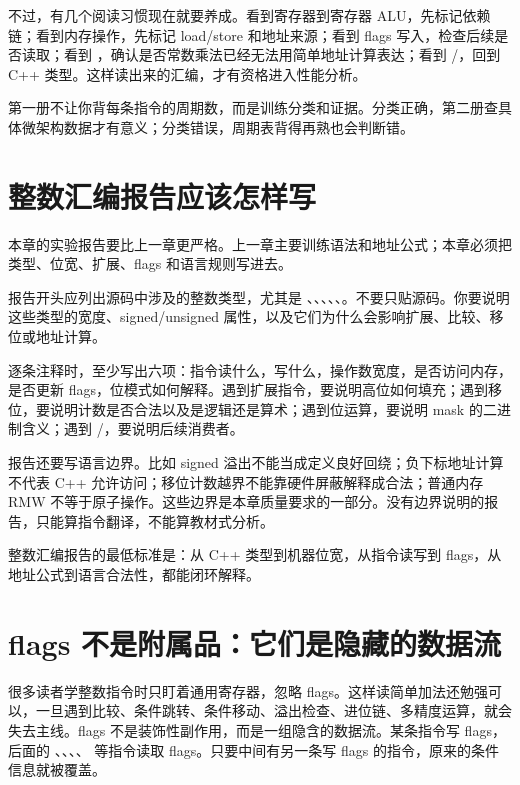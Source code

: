 不过，有几个阅读习惯现在就要养成。看到寄存器到寄存器 ALU，先标记依赖链；看到内存操作，先标记 load/store 和地址来源；看到 flags 写入，检查后续是否读取；看到 ，确认是否常数乘法已经无法用简单地址计算表达；看到 /，回到 C++ 类型。这样读出来的汇编，才有资格进入性能分析。

\begin{mentalmodel}
第一册不让你背每条指令的周期数，而是训练分类和证据。分类正确，第二册查具体微架构数据才有意义；分类错误，周期表背得再熟也会判断错。
\end{mentalmodel}

\section{整数汇编报告应该怎样写}

本章的实验报告要比上一章更严格。上一章主要训练语法和地址公式；本章必须把类型、位宽、扩展、flags 和语言规则写进去。

报告开头应列出源码中涉及的整数类型，尤其是 、、、、、。不要只贴源码。你要说明这些类型的宽度、signed/unsigned 属性，以及它们为什么会影响扩展、比较、移位或地址计算。

逐条注释时，至少写出六项：指令读什么，写什么，操作数宽度，是否访问内存，是否更新 flags，位模式如何解释。遇到扩展指令，要说明高位如何填充；遇到移位，要说明计数是否合法以及是逻辑还是算术；遇到位运算，要说明 mask 的二进制含义；遇到 /，要说明后续消费者。

报告还要写语言边界。比如 signed 溢出不能当成定义良好回绕；负下标地址计算不代表 C++ 允许访问；移位计数越界不能靠硬件屏蔽解释成合法；普通内存 RMW 不等于原子操作。这些边界是本章质量要求的一部分。没有边界说明的报告，只能算指令翻译，不能算教材式分析。

\begin{keyidea}
整数汇编报告的最低标准是：从 C++ 类型到机器位宽，从指令读写到 flags，从地址公式到语言合法性，都能闭环解释。
\end{keyidea}

\section{flags 不是附属品：它们是隐藏的数据流}

很多读者学整数指令时只盯着通用寄存器，忽略 flags。这样读简单加法还勉强可以，一旦遇到比较、条件跳转、条件移动、溢出检查、进位链、多精度运算，就会失去主线。flags 不是装饰性副作用，而是一组隐含的数据流。某条指令写 flags，后面的 、、、、 等指令读取 flags。只要中间有另一条写 flags 的指令，原来的条件信息就被覆盖。

